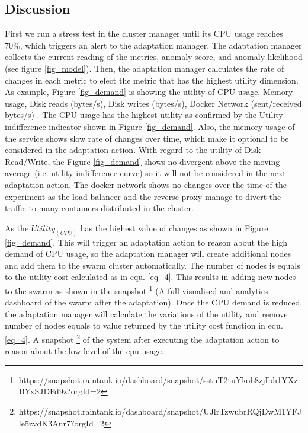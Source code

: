 \documentclass[graybox]{svmult}
\begin{document}
\subsection{Discussion}
First we run a stress test in the cluster manager until its CPU usage reaches 70\%, which triggers an alert to the adaptation manager. The adaptation manager collects the current reading of the metrics, anomaly score, and anomaly likelihood (see figure \ref{fig_model}). Then, the adaptation manager calculates the rate of changes in each metric to elect the metric that has the highest utility dimension. As example, Figure \ref{fig_demand} is showing the utility of CPU usage, Memory usage, Disk reads (bytes/s), Disk writes (bytes/s), Docker Network (sent/received bytes/s) . The CPU usage has the highest utility as confirmed by the Utility indifference indicator shown in Figure \ref{fig_demand}. Also, the memory usage of the service shows slow rate of changes over time, which make it optional to be considered in the adaptation action. With regard to the utility of Disk Read/Write, the Figure \ref{fig_demand} shows no divergent above the moving average (i.e. utility indifference curve) so it will not be considered in the next adaptation action. The docker network shows no changes over the time of the experiment as the load balancer and the reverse proxy manage to divert the traffic to many containers distributed in the cluster.

As the $Utility_(CPU)$ has the highest value of changes as shown in Figure \ref{fig_demand}. This will trigger an adaptation action to reason about the high demand of CPU usage, so the adaptation manager will create additional nodes and add them to the swarm cluster automatically. The number of nodes is equals to the utility cost calculated as in equ. \ref{eq_4}. This results in adding new nodes to the swarm as shown in the snapshot \footnote{https://snapshot.raintank.io/dashboard/snapshot/sstuT2tuYkob8zjIbh1YXzBYxSJDFd9z?orgId=2} (A full visualised and analytics dashboard of the swarm after the adaptation).
Once the CPU demand is reduced, the adaptation manager will calculate the variations of the utility and remove number of nodes equals to value returned by the utility cost function in equ. \ref{eq_4}. A snapshot \footnote{https://snapshot.raintank.io/dashboard/snapshot/UJlrTzwubrRQjDwM1YFJle5zvdK3Anr7?orgId=2} of the system after executing the adaptation action to reason about the low level of the cpu usage. 

 
\end{document}
